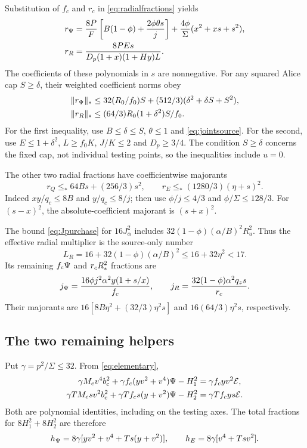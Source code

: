 Substitution of $f_c$ and $r_c$ in \eqref{eq:radialfractions} yields
\begin{align}
 r_\Psi&=\frac{8P}{F}\left[B(1-\phi)+\frac{2\phi\theta s}{j}\right]
       +\frac{4\phi}{\Sigma}(x^2+xs+s^2),\notag\\
 r_R&=\frac{8PEs}{D_p(1+x)(1+Hy)L}.
 \label{eq:jointfractions}
\end{align}
The coefficients of these polynomials in $s$ are nonnegative.
For any squared Alice cap $S\geq\delta$, their weighted coefficient
norms obey
\begin{align}
 \|r_\Psi\|_*&\leq32(R_0/f_0)S
                   +(512/3)(\delta^2+\delta S+S^2),\notag\\
 \|r_R\|_*&\leq(64/3)R_0(1+\delta^2)S/f_0 .
 \label{eq:jointradialbounds}
\end{align}
For the first inequality, use $B\leq\delta\leq S$, $\theta\leq1$
and \eqref{eq:jointsource}. For the second, use $E\leq1+\delta^2$,
$L\geq f_0K$, $J/K\leq2$ and $D_p\geq3/4$.
The condition $S\geq\delta$ concerns the fixed cap, not individual
testing points, so the inequalities include $u=0$.

The other two radial fractions have coefficientwise majorants
\begin{equation}
 r_Q\leq_*64Bs+(256/3)s^2,\qquad
 r_E\leq_*(1280/3)(\eta+s)^2.
 \label{eq:radialmajorants}
\end{equation}
Indeed $xy/q_c\leq8B$ and $y/q_c\leq8/j$; then use
$\phi/j\leq4/3$ and $\phi/\Sigma\leq128/3$.
For $(s-x)^2$, the absolute-coefficient majorant is $(s+x)^2$.

The bound \eqref{eq:Jpurchase} for $16J_\alpha^2$ includes
$32(1-\phi)(\alpha/B)^2R_u^2$.
Thus the effective radial multiplier is the source-only number
\begin{equation}
 L_R=16+32(1-\phi)(\alpha/B)^2
          \leq16+32\eta^2<17 .
 \label{eq:radialmultiplier}
\end{equation}
Its remaining $f_c\Psi$ and $r_cR_*^2$ fractions are
\begin{equation}
 j_\Psi=\frac{16\phi j^2\alpha^2y(1+s/x)}{f_c},\qquad
 j_R=\frac{32(1-\phi)\alpha^2q_zs}{r_c}.
 \label{eq:Jfractions}
\end{equation}
Their majorants are $16[8B\eta^2+(32/3)\eta^2s]$ and
$16(64/3)\eta^2s$, respectively.

\subsection*{The two remaining helpers}
Put $\gamma=p^2/\Sigma\leq32$. From \eqref{eq:elementary},
\begin{align}
 \gamma M_ev^4b_{\mathrm c}^2+\gamma f_c(yv^2+v^4)\Psi-H_1^2
       &=\gamma f_cyv^2\mathcal E,\notag\\
 \gamma TM_esv^2b_{\mathrm c}^2+\gamma Tf_cs(y+v^2)\Psi-H_2^2
       &=\gamma Tf_cys\mathcal E .
 \label{eq:Hhelpers}
\end{align}
Both are polynomial identities, including on the testing axes.
The total fractions for $8H_1^2+8H_2^2$ are therefore
\[
 h_\Psi=8\gamma[yv^2+v^4+Ts(y+v^2)],\qquad
 h_E=8\gamma[v^4+Tsv^2].
\]

